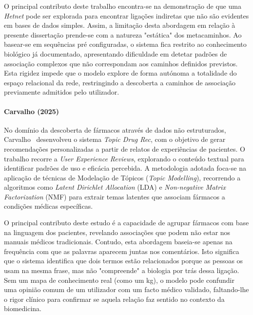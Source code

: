 O principal contributo deste trabalho encontra-se na demonstração de que uma \emph{Hetnet} pode ser explorada para encontrar ligações indiretas que não são evidentes em bases de dados simples. Assim, a limitação desta abordagem em relação à presente dissertação prende-se com a natureza "estática" dos metacaminhos. Ao basear-se em sequências pré configuradas, o sistema fica restrito ao conhecimento biológico já documentado, apresentando dificuldade em detetar padrões de associação complexos que não correspondam aos caminhos definidos previstos. Esta rigidez impede que o modelo explore de forma autónoma a totalidade do espaço relacional da rede, restringindo a descoberta a caminhos de associação previamente admitidos pelo utilizador.

\paragraph{Carvalho (2025)}
No domínio da descoberta de fármacos através de dados não estruturados, Carvalho~\cite{carvalho2025} desenvolveu o sistema \emph{Topic Drug Rec}, com o objetivo de gerar recomendações personalizadas a partir de relatos de experiências de pacientes. O trabalho recorre a \emph{User Experience Reviews}, explorando o conteúdo textual para identificar padrões de uso e eficácia percebida. A metodologia adotada foca-se na aplicação de técnicas de Modelação de Tópicos (\textit{Topic Modelling}), recorrendo a algoritmos como \emph{Latent Dirichlet Allocation} (LDA) e \emph{Non-negative Matrix Factorization} (NMF) para extrair temas latentes que associam fármacos a condições médicas específicas.

O principal contributo deste estudo é a capacidade de agrupar fármacos com base na linguagem dos pacientes, revelando associações que podem não estar nos manuais médicos tradicionais. Contudo, esta abordagem baseia-se apenas na frequência com que as palavras aparecem juntas nos comentários. Isto significa que o sistema identifica que dois termos estão relacionados porque as pessoas os usam na mesma frase, mas não "compreende" a biologia por trás dessa ligação. Sem um mapa de conhecimento real (como um \acrshort{kg}), o modelo pode confundir uma opinião comum de um utilizador com um facto médico validado, faltando-lhe o rigor clínico para confirmar se aquela relação faz sentido no contexto da biomedicina.


